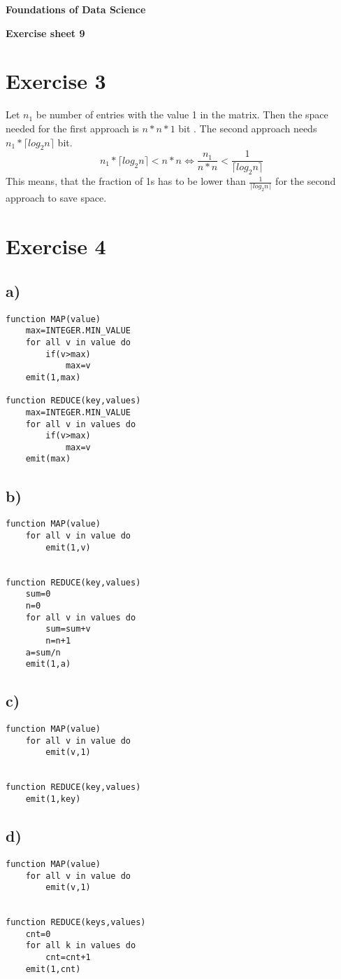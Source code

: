 \documentclass[a4paper,10pt]{article}
\begin{document}
\centerline{\Large\bfseries  Foundations of Data Science }
\centerline{\bfseries  Exercise sheet 9}
\section*{Exercise 3}
Let $n_1$ be number of entries with the value 1 in the matrix. Then the space needed for the first approach is $n*n*1$ bit . The second approach needs $n_1 * \lceil log_2 n \rceil$ bit. 
\[n_1 * \lceil log_2 n \rceil < n*n \Leftrightarrow \frac{n_1}{n*n} < \frac{1}{\lceil log_2 n \rceil} \]
This means, that the fraction of 1s has to be lower than $\frac{1}{\lceil log_2 n \rceil}$ for the second approach to save space.
\section*{Exercise 4}
\subsection*{a)}
\begin{lstlisting}
function MAP(value)
	max=INTEGER.MIN_VALUE
	for all v in value do
		if(v>max)
			max=v
	emit(1,max)
	
function REDUCE(key,values)
	max=INTEGER.MIN_VALUE
	for all v in values do
		if(v>max)
			max=v
	emit(max)
\end{lstlisting}
\subsection*{b)}
\begin{lstlisting}
function MAP(value)
	for all v in value do
		emit(1,v)

	
function REDUCE(key,values)
	sum=0
	n=0
	for all v in values do
		sum=sum+v
		n=n+1
	a=sum/n
	emit(1,a)
\end{lstlisting}

\subsection*{c)}
\begin{lstlisting}
function MAP(value)
	for all v in value do
		emit(v,1)

	
function REDUCE(key,values)
	emit(1,key)
\end{lstlisting}

\subsection*{d)}
\begin{lstlisting}
function MAP(value)
	for all v in value do
		emit(v,1)

	
function REDUCE(keys,values)
	cnt=0
	for all k in values do
		cnt=cnt+1
	emit(1,cnt)
		
\end{lstlisting}
\end{document}
